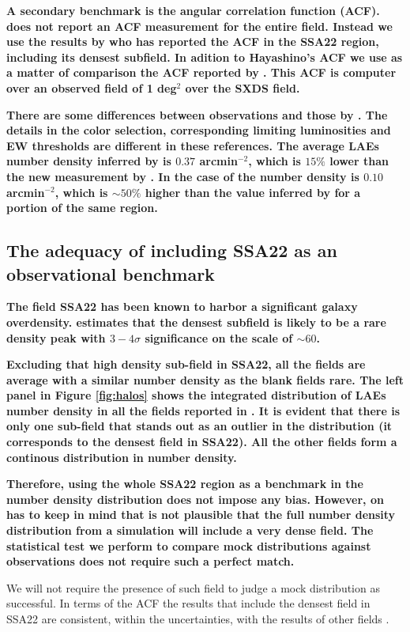 \documentclass[usenatbib]{mn2e}
\newcommand{\hMpc}{{\ifmmode{h^{-1}{\rm Mpc}}\else{$h^{-1}$Mpc }\fi}}
\begin{document}
{\bf A secondary benchmark is the angular correlation function
(ACF). \cite{Yamada2012} does not report an ACF measurement for
  the entire field. Instead we use the results by
  \cite{Hayashino2004} who has reported the ACF in the SSA22 region,
  including its densest subfield. In adition to Hayashino's ACF we use
  as a matter of comparison the ACF reported by
  \cite{Ouchi2008}. This ACF is computer over an observed field of 1
  deg$^2$ over the SXDS field.}


{\bf There are some differences between \cite{Ouchi2008} observations
  and those by \cite{Yamada2012}. The details in the color selection,
  corresponding limiting luminosities and EW thresholds are different
  in these references. The average LAEs number density inferred by
  \cite{Hayashino2004} is   $0.37$ arcmin$^{-2}$, which is $15\%$
  lower than the new measurement by \cite{Yamada2012}. In the case of
  \cite{Ouchi2008} the number density is $0.10$ arcmin$^{-2}$, which
  is $\sim 50\%$ higher than the value inferred by \cite{Yamada2012}
  for a portion of the same region.} 


\subsection{The adequacy of including SSA22 as an observational benchmark}

{\bf The field SSA22 has been known to harbor a significant
  galaxy overdensity. \cite{Yamada2012} estimates that the densest
  subfield is likely to be a rare density peak with $3-4\sigma$
  significance on the scale of $\sim 60$\hMpc.}

{\bf Excluding that high density sub-field in SSA22, all the fields
  are average with a similar number density as the blank fields
  rare. The left panel in Figure \ref{fig:halos} shows the integrated distribution of LAEs number density in all the fields reported in
  \cite{Yamada2012}. It is evident that there is only one sub-field that
  stands out as an outlier in the distribution (it corresponds to the
  densest field in SSA22). All the other fields form a continous
  distribution in number density.}  


{\bf Therefore, using the whole SSA22 region as a benchmark in the
  number density distribution does not impose any bias. However, on
  has to  keep in mind that is not plausible that the full number
  density distribution from a simulation will include a very dense
  field. The statistical test we perform to compare mock distributions against
  observations does not require such a perfect match. 
  
We will not
  require the presence of such field to judge a mock distribution as
  successful. In terms of the ACF the results that include the densest
  field in SSA22 \citep{Hayashino2004} are consistent, within the
  uncertainties, with the results of other fields \citep{Ouchi2008}.} 
\end{document}
